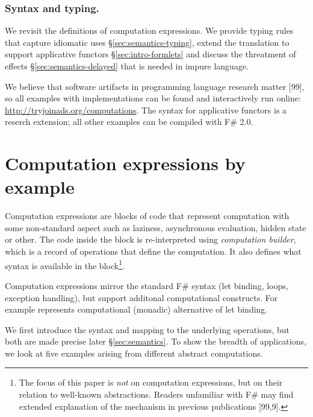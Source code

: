\documentclass[runningheads,a4paper]{llncs}
\begin{document}
\vspace{-1em}
\subsubsection{Syntax and typing.} We revisit the definitions of computation expressions. We provide
typing rules that capture idiomatic uses \S\ref{sec:semantics-typing}, extend the translation
to support applicative functors \S\ref{sec:intro-formlets} and discuss the threatment of effects
\S\ref{sec:semantics-delayed} that is needed in impure language.

\vspace{1em}
\noindent
We believe that software artifacts in programming language research matter [99], so all examples 
with implementations can be found and interactively run online: \url{http://tryjoinads.org/computations}. 
The syntax for applicative functors is a reserch extension; all other examples can be 
compiled with F\# 2.0.


\section{Computation expressions by example}
\label{sec:intro}

Computation expressions are blocks of code that represent computation with some non-standard 
aspect such as laziness, asynchronous evaluation, hidden state or other. The code inside the
block is re-interpreted using \emph{computation builder}, which is a record of operations that 
define the computation. It also defines what syntax is available in the block\footnote{The focus 
of this paper is \emph{not} on computation expressions, but on their relation to well-known 
abstractions. Readers unfamiliar with F\# may find extended explanation of the mechanism 
in previous publications [99,9].}.

Computation expressions mirror the standard F\# syntax (let binding, loops, exception handling),
but support additonal computational constructs. For example  represents computational 
(monadic) alternative of let binding.

We first introduce the syntax and mapping to the underlying operations, but both are made precise 
later \S\ref{sec:semantics}. To show the breadth of applications, we look at five examples arising 
from different abstract computations.
\end{document}

